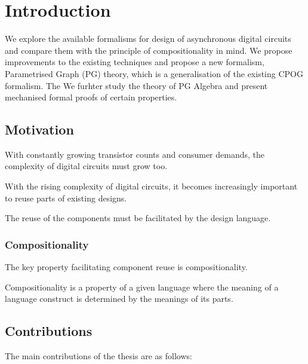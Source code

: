 
\chapter{Introduction}

We explore the available formalisms for design of asynchronous digital
circuits and compare them with the principle of compositionality in
mind. We propose improvements to the existing techniques and
propose a new formalism, Parametrised Graph (PG) theory, which is a
generalisation of the existing CPOG formalism. The We furhter study 
the theory of PG Algebra and present mechanised formal proofs of certain properties.


\section{Motivation}

With constantly growing transistor counts and consumer demands, the complexity of digital circuits must grow too.

With the rising complexity of digital circuits, it becomes increasingly important to reuse parts of existing designs.

The reuse of the components must be facilitated by the design language.

\subsection{Compositionality}

The key property facilitating component reuse is compositionality.

Compositionality is a property of a given language where the meaning of a language construct is determined by the meanings of its parts.




\section{Contributions}

The main contributions of the thesis are as follows:

